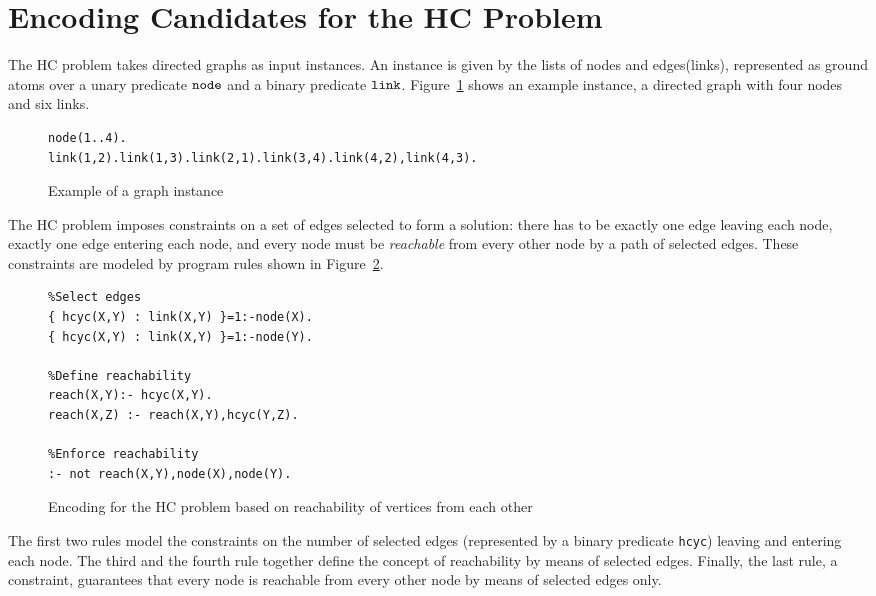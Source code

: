 \documentclass{new_tlp}
\begin{document}
\section{Encoding Candidates for the HC Problem}
%
The HC problem takes directed graphs as input instances. An instance is given 
by the lists of nodes and edges(links), represented as ground atoms over a unary 
predicate $\tt{node}$ and a binary predicate $\tt{link}$. Figure~\ref{graphinstance} shows
an example instance, a directed graph with four nodes and six links.

\begin{figure}
\figrule
\begin{center}
\begin{verbatim}
node(1..4).
link(1,2).link(1,3).link(2,1).link(3,4).link(4,2),link(4,3).
\end{verbatim}
\end{center}
\caption{Example of a graph instance}\label{graphinstance}
\figrule
\end{figure}

The HC problem imposes constraints on a set of edges selected to form a 
solution: there has to be exactly one edge leaving each node, exactly one edge
entering each node, and every node must be \emph{reachable} from every other 
node by a path of selected edges. These constraints are modeled by program
rules shown in Figure~\ref{reachencod}.

\begin{figure}
\figrule
\begin{center}
\begin{verbatim}
%Select edges
{ hcyc(X,Y) : link(X,Y) }=1:-node(X).
{ hcyc(X,Y) : link(X,Y) }=1:-node(Y).

%Define reachability
reach(X,Y):- hcyc(X,Y).
reach(X,Z) :- reach(X,Y),hcyc(Y,Z).

%Enforce reachability
:- not reach(X,Y),node(X),node(Y).
\end{verbatim}
\end{center}
\caption{Encoding for the HC problem based on reachability of vertices from
each other}\label{reachencod}
\figrule
\end{figure}

The first two rules model the constraints on the number of selected edges 
(represented by a binary predicate {\tt hcyc}) leaving and entering each node. 
The third and the fourth rule together define the concept of reachability by 
means of selected edges. Finally, the last rule, a constraint, guarantees that
every node is reachable from every other node by means of selected edges only.
\end{document}

